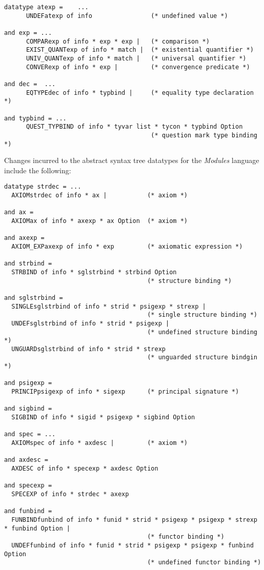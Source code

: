 {\small
\begin{verbatim}
datatype atexp =    ...
      UNDEFatexp of info                (* undefined value *)

and exp = ...
      COMPARexp of info * exp * exp |   (* comparison *)
      EXIST_QUANTexp of info * match |  (* existential quantifier *)
      UNIV_QUANTexp of info * match |   (* universal quantifier *)
      CONVERexp of info * exp |         (* convergence predicate *)

and dec =  ...
      EQTYPEdec of info * typbind |     (* equality type declaration *)

and typbind = ...
      QUEST_TYPBIND of info * tyvar list * tycon * typbind Option
                                        (* question mark type binding *)
\end{verbatim}
}

\noindent Changes incurred to the abstract syntax tree datatypes for
the {\em Modules} language include the following:

{\small
\begin{verbatim}
datatype strdec = ...
  AXIOMstrdec of info * ax |           (* axiom *)

and ax =
  AXIOMax of info * axexp * ax Option  (* axiom *)

and axexp = 
  AXIOM_EXPaxexp of info * exp         (* axiomatic expression *)

and strbind =
  STRBIND of info * sglstrbind * strbind Option
                                       (* structure binding *)

and sglstrbind =
  SINGLEsglstrbind of info * strid * psigexp * strexp |
                                       (* single structure binding *)
  UNDEFsglstrbind of info * strid * psigexp |
                                       (* undefined structure binding *)
  UNGUARDsglstrbind of info * strid * strexp
                                       (* unguarded structure bindgin *)

and psigexp =
  PRINCIPpsigexp of info * sigexp      (* principal signature *)

and sigbind =
  SIGBIND of info * sigid * psigexp * sigbind Option

and spec = ...
  AXIOMspec of info * axdesc |         (* axiom *)

and axdesc = 
  AXDESC of info * specexp * axdesc Option

and specexp =
  SPECEXP of info * strdec * axexp

and funbind =
  FUNBINDfunbind of info * funid * strid * psigexp * psigexp * strexp * funbind Option |
                                       (* functor binding *)
  UNDEFfunbind of info * funid * strid * psigexp * psigexp * funbind Option
                                       (* undefined functor binding *)
\end{verbatim}
}

